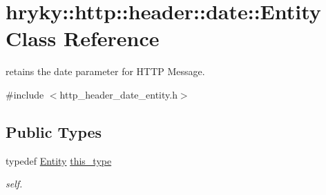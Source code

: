 \hypertarget{classhryky_1_1http_1_1header_1_1date_1_1_entity}{\section{hryky\-:\-:http\-:\-:header\-:\-:date\-:\-:Entity Class Reference}
\label{classhryky_1_1http_1_1header_1_1date_1_1_entity}
}


retains the date parameter for H\-T\-T\-P Message.  




{\ttfamily \#include $<$http\-\_\-header\-\_\-date\-\_\-entity.\-h$>$}

\subsection*{Public Types}
\begin{DoxyCompactItemize}
\item 
\hypertarget{classhryky_1_1http_1_1header_1_1date_1_1_entity_added79307f2e97ca6c8e687bc56c7b5b}{typedef \hyperlink{classhryky_1_1http_1_1header_1_1date_1_1_entity}{Entity} \hyperlink{classhryky_1_1http_1_1header_1_1date_1_1_entity_added79307f2e97ca6c8e687bc56c7b5b}{this\-\_\-type}}\label{classhryky_1_1http_1_1header_1_1date_1_1_entity_added79307f2e97ca6c8e687bc56c7b5b}

\begin{DoxyCompactList}\small\item\em self. \end{DoxyCompactList}\end{DoxyCompactItemize}
